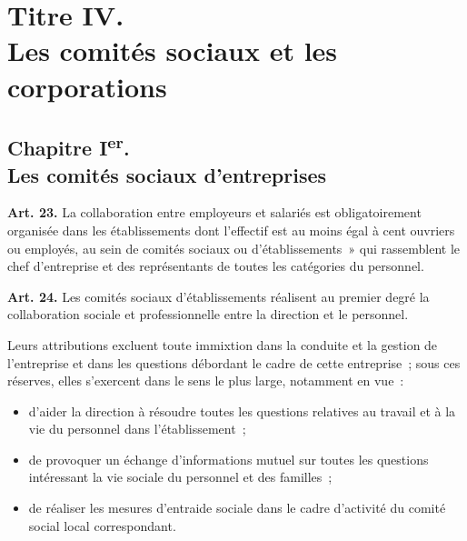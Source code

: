 \documentclass[french,twoside]{book} %
\newcommand{\labelchar}[1]{\textbf{\color{rubric} #1}}
\begin{document}
\section[{Titre IV. Les comités sociaux et les corporations}]{Titre IV. \\
Les comités sociaux et les corporations}\renewcommand{\leftmark}{Titre IV. \\
Les comités sociaux et les corporations}

\subsection[{Chapitre Ier. Les comités sociaux d’entreprises}]{Chapitre I\textsuperscript{er}. \\
Les comités sociaux d’entreprises}
\noindent \labelchar{Art. 23.} La collaboration entre employeurs et salariés est obligatoirement organisée dans les établissements dont l’effectif est au moins égal à cent ouvriers ou employés, au sein de comités sociaux ou d’établissements » qui rassemblent le chef d’entreprise et des représentants de toutes les catégories du personnel.\par
\bigbreak
\noindent \labelchar{Art. 24.} Les comités sociaux d’établissements réalisent au premier degré la collaboration sociale et professionnelle entre la direction et le personnel.\par
Leurs attributions excluent toute immixtion dans la conduite et la gestion de l’entreprise et dans les questions débordant le cadre de cette entreprise ; sous ces réserves, elles s’exercent dans le sens le plus large, notamment en vue :\par

\begin{itemize}[itemsep=0pt,]
\item d’aider la direction à résoudre toutes les questions relatives au travail et à la vie du personnel dans l’établissement ;
\item de provoquer un échange d’informations mutuel sur toutes les questions intéressant la vie sociale du personnel et des familles ;
\item de réaliser les mesures d’entraide sociale dans le cadre d’activité du comité social local correspondant.
\end{itemize}
\end{document}
